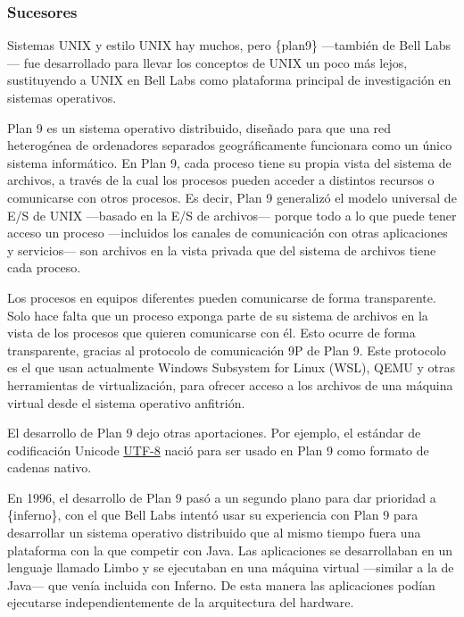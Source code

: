 \subsubsection{Sucesores}\label{_sucesores}

Sistemas UNIX y estilo UNIX hay muchos, pero \{plan9\} ---también de
Bell Labs--- fue desarrollado para llevar los conceptos de UNIX un poco
más lejos, sustituyendo a UNIX en Bell Labs como plataforma principal de
investigación en sistemas operativos.

Plan 9 es un sistema operativo distribuido, diseñado para que una red
heterogénea de ordenadores separados geográficamente funcionara como un
único sistema informático. En Plan 9, cada proceso tiene su propia vista
del sistema de archivos, a través de la cual los procesos pueden acceder
a distintos recursos o comunicarse con otros procesos. Es decir, Plan 9
generalizó el modelo universal de E/S de UNIX ---basado en la E/S de
archivos--- porque todo a lo que puede tener acceso un proceso
---incluidos los canales de comunicación con otras aplicaciones y
servicios--- son archivos en la vista privada que del sistema de
archivos tiene cada proceso.

Los procesos en equipos diferentes pueden comunicarse de forma
transparente. Solo hace falta que un proceso exponga parte de su sistema
de archivos en la vista de los procesos que quieren comunicarse con él.
Esto ocurre de forma transparente, gracias al protocolo de comunicación
9P de Plan 9. Este protocolo es el que usan actualmente Windows
Subsystem for Linux (WSL), QEMU y otras herramientas de virtualización,
para ofrecer acceso a los archivos de una máquina virtual desde el
sistema operativo anfitrión.

El desarrollo de Plan 9 dejo otras aportaciones. Por ejemplo, el
estándar de codificación Unicode
\href{https://es.wikipedia.org/wiki/UTF-8}{UTF-8} nació para ser usado
en Plan 9 como formato de cadenas nativo.

En 1996, el desarrollo de Plan 9 pasó a un segundo plano para dar
prioridad a \{inferno\}, con el que Bell Labs intentó usar su
experiencia con Plan 9 para desarrollar un sistema operativo distribuido
que al mismo tiempo fuera una plataforma con la que competir con Java.
Las aplicaciones se desarrollaban en un lenguaje llamado Limbo y se
ejecutaban en una máquina virtual ---similar a la de Java--- que venía
incluida con Inferno. De esta manera las aplicaciones podían ejecutarse
independientemente de la arquitectura del hardware.

